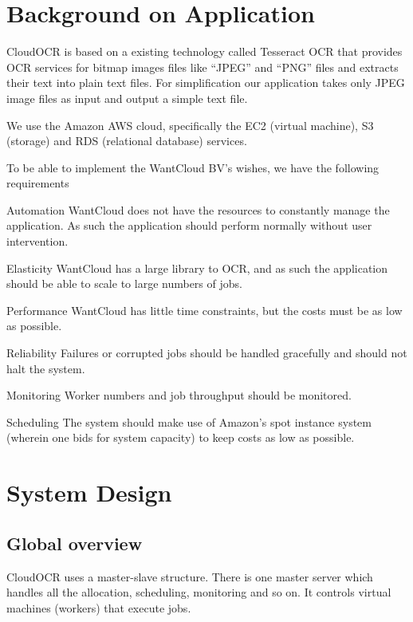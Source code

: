 \documentclass[a4paper]{IEEEtran}
\begin{document}
\section{Background on Application}
\label{sec:backgroundonapplication}
CloudOCR is based on a existing technology called Tesseract OCR \cite{tesseractocr} that provides OCR services for bitmap images files like ``JPEG'' and ``PNG'' files and extracts their text into plain text files. For simplification our application takes only JPEG image files as input and output a simple text file.

We use the Amazon AWS cloud, specifically the EC2 (virtual machine), S3 (storage) and RDS (relational database) services.

To be able to implement the WantCloud BV's wishes, we have the following requirements
\begin{LaTeXdescription}
	\item[Automation] WantCloud does not have the resources to constantly manage the application. As such the application should perform normally without user intervention.
	\item[Elasticity] WantCloud has a large library to OCR, and as such the application should be able to scale to large numbers of jobs.
	\item[Performance] WantCloud has little time constraints, but the costs must be as low as possible.
	\item[Reliability] Failures or corrupted jobs should be handled gracefully and should not halt the system.
	\item[Monitoring] Worker numbers and job throughput should be monitored.
	\item[Scheduling] The system should make use of Amazon's spot instance system (wherein one bids for system capacity) to keep costs as low as possible.
\end{LaTeXdescription}

\section{System Design}
\label{sec:systemdesign}

\subsection*{Global overview}

CloudOCR uses a master-slave structure. There is one master server which handles all the allocation, scheduling, monitoring and so on. It controls virtual machines (workers) that execute jobs.
\end{document}
